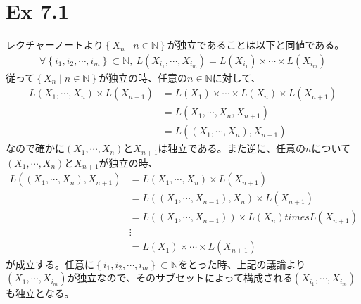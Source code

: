 \documentclass{article}
\begin{document}
\section{Ex 7.1}
レクチャーノートより$\left\{ X_n \mid n \in \mathbb{N}\right\}$が独立であることは以下と同値である。
\begin{align*}
	\forall \left\{ i_1, i_2, \cdots, i_m \right\} \subset \mathbb{N},\ L\left( X_{i_1}, \cdots, X_{i_m} \right) = L\left( X_{i_1} \right)\times \cdots \times L\left( X_{i_m} \right)
\end{align*}
従って$\left\{ X_n \mid n \in \mathbb{N}\right\}$が独立の時、任意の$n \in \mathbb{N}$に対して、
\begin{align*}
	L\left( X_1, \cdots, X_n \right) \times L(X_{n+1}) &= L\left( X_{1} \right)\times \cdots \times L\left( X_{n} \right) \times L\left( X_{n+1} \right)\\
	&= L\left( X_1, \cdots, X_n, X_{n+1} \right)\\ &= L\left( \left(X_1, \cdots, X_n\right), X_{n+1} \right)
\end{align*}
なので確かに$\left(X_1, \cdots, X_n\right)$と$X_{n+1}$は独立である。また逆に、任意の$n$について$\left(X_1, \cdots, X_n\right)$と$X_{n+1}$が独立の時、
\begin{align*}
	L\left( \left(X_1, \cdots, X_n\right), X_{n+1} \right) &= L\left( X_1, \cdots, X_n \right) \times L(X_{n+1})\\
	&= L\left( \left(X_1, \cdots, X_{n-1}\right), X_n \right) \times L(X_{n+1})\\
	&= L\left( \left(X_1, \cdots, X_{n-1}\right)\right) \times L(X_{n}) times L(X_{n+1})\\
	& \vdots\\
	&= L\left( X_1 \right)\times \cdots \times L\left( X_{n+1} \right)
\end{align*}
が成立する。任意に$\left\{ i_1, i_2, \cdots, i_m \right\} \subset \mathbb{N}$をとった時、上記の議論より$\left( X_1, \cdots, X_{i_m} \right)$が独立なので、そのサブセットによって構成される$\left( X_{i_1}, \cdots, X_{i_m} \right)$も独立となる。
\end{document}
